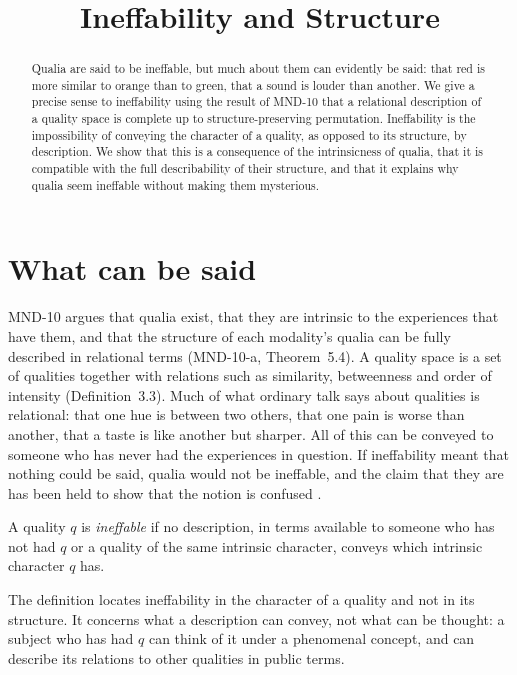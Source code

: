 \documentclass{situationist-preprint}
\title{Ineffability and Structure}
\begin{document}
\maketitle

\begin{abstract}
Qualia are said to be ineffable, but much about them can evidently be said: that red is more similar to orange than to green, that a sound is louder than another. We give a precise sense to ineffability using the result of MND-10 that a relational description of a quality space is complete up to structure-preserving permutation. Ineffability is the impossibility of conveying the character of a quality, as opposed to its structure, by description. We show that this is a consequence of the intrinsicness of qualia, that it is compatible with the full describability of their structure, and that it explains why qualia seem ineffable without making them mysterious.
\end{abstract}

\section{What can be said}

MND-10 argues that qualia exist, that they are intrinsic to the experiences that have them, and that the structure of each modality's qualia can be fully described in relational terms (MND-10-a, Theorem~5.4). A quality space is a set of qualities together with relations such as similarity, betweenness and order of intensity (Definition~3.3). Much of what ordinary talk says about qualities is relational: that one hue is between two others, that one pain is worse than another, that a taste is like another but sharper. All of this can be conveyed to someone who has never had the experiences in question. If ineffability meant that nothing could be said, qualia would not be ineffable, and the claim that they are has been held to show that the notion is confused \citep{Dennett1988}.

\begin{definition}\label{d:ineff}
A quality $q$ is \emph{ineffable} if no description, in terms available to someone who has not had $q$ or a quality of the same intrinsic character, conveys which intrinsic character $q$ has.
\end{definition}

The definition locates ineffability in the character of a quality and not in its structure. It concerns what a description can convey, not what can be thought: a subject who has had $q$ can think of it under a phenomenal concept, and can describe its relations to other qualities in public terms.
\end{document}
